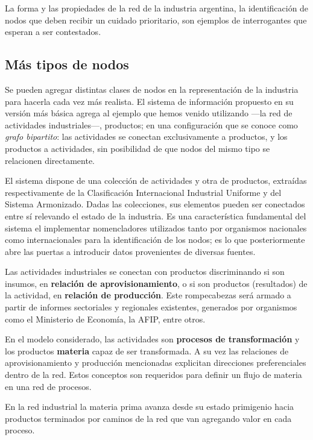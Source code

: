 \documentclass[a4paper]{report}
\begin{document}
La forma y las propiedades de la red de la industria argentina, la identificación de nodos que deben recibir un cuidado prioritario, son ejemplos de interrogantes que esperan a ser contestados.

\subsection*{Más tipos de nodos}

Se pueden agregar distintas clases de nodos en la representación de la industria para hacerla cada vez más realista. El sistema de información propuesto en su versión más básica agrega al ejemplo que hemos venido utilizando —la red de actividades industriales—, productos; en una configuración que se conoce como \textit{grafo bipartito}: las actividades se conectan exclusivamente a productos, y los productos a actividades, sin posibilidad de que nodos del mismo tipo se relacionen directamente.

El sistema dispone de una colección de actividades y otra de productos, extraídas respectivamente de la Clasificación Internacional Industrial Uniforme y del Sistema Armonizado. Dadas las colecciones, sus elementos pueden ser conectados entre sí relevando el estado de la industria. Es una característica fundamental del sistema el implementar nomencladores utilizados tanto por organismos nacionales como internacionales para la identificación de los nodos; es lo que posteriormente abre las puertas a introducir datos provenientes de diversas fuentes.

Las actividades industriales se conectan con productos discriminando si son insumos, en \textbf{relación de aprovisionamiento}, o si son productos (resultados) de la actividad, en \textbf{relación de producción}. Este rompecabezas será armado a partir de informes sectoriales y regionales existentes, generados por organismos como el Ministerio de Economía, la AFIP, entre otros.

En el modelo considerado, las actividades son \textbf{procesos de transformación} y los productos \textbf{materia} capaz de ser transformada. A su vez las relaciones de aprovisionamiento y producción mencionadas explicitan direcciones preferenciales dentro de la red. Estos conceptos son requeridos para definir un flujo de materia en una red de procesos.

En la red industrial la materia prima avanza desde su estado primigenio hacia productos terminados por caminos de la red que van agregando valor en cada proceso.
\end{document}
